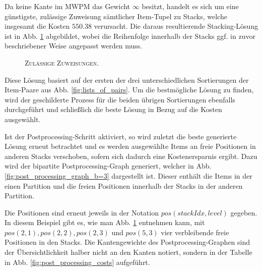 Da keine Kante im \textsc{MWPM} das Gewicht $\infty$ besitzt, handelt es sich um eine günstigste, zulässige Zuweisung
sämtlicher Item-Tupel zu Stacks, welche insgesamt die Kosten $550.38$ verursacht.
Die daraus resultierende Stacking-Lösung ist in Abb. \ref{fig:valid_solution} abgebildet, wobei die Reihenfolge
innerhalb der Stacks ggf. in zuvor beschriebener Weise angepasst werden muss.
\begin{figure}[H]
  \centering
    \caption{\textsc{Zulässige Zuweisungen.}}
    \label{fig:valid_solution}
\end{figure}

Diese Lösung basiert auf der ersten der drei unterschiedlichen Sortierungen der Item-Paare aus Abb. \ref{fig:lists_of_pairs}.
Um die bestmögliche Lösung zu finden, wird der geschilderte Prozess für die beiden übrigen Sortierungen
ebenfalls durchgeführt und schließlich die beste Lösung in Bezug auf die Kosten ausgewählt.

Ist der Postprocessing-Schritt aktiviert, so wird zuletzt die beste generierte Lösung erneut betrachtet
und es werden ausgewählte Items an freie Positionen in anderen Stacks verschoben, sofern sich dadurch eine
Kostenersparnis ergibt.
Dazu wird der bipartite Postprocessing-Graph generiert, welcher in Abb. \ref{fig:post_processing_graph_b=3} dargestellt ist.
Dieser enthält die Items in der einen Partition und die freien Positionen innerhalb der Stacks in der anderen Partition.

Die Positionen sind erneut jeweils in der Notation $pos(stackIdx, level)$ gegeben. In diesem Beispiel gibt es,
wie man Abb. \ref{fig:valid_solution} entnehmen kann, mit $pos(2, 1), pos(2, 2), pos(2, 3)$ und $pos(5, 3)$
vier verbleibende freie Positionen in den Stacks. Die Kantengewichte des Postprocessing-Graphen sind der Übersichtlichkeit halber nicht an den Kanten notiert, sondern in der Tabelle in Abb. \ref{fig:post_processing_costs} aufgeführt.

